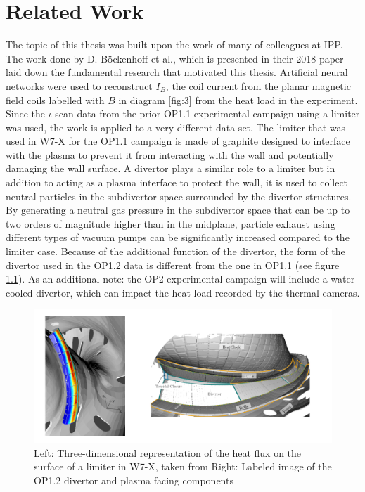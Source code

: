 %
\chapter{Related Work}
\label{sec:related}


The topic of this thesis was built upon the work of many of colleagues at IPP. The work done by D. Böckenhoff et al., which is presented in their 2018 paper \cite{Böckenhoff_2018} laid down the fundamental research that motivated this thesis. Artificial neural networks were used to reconstruct $I_B$, the coil current from the planar magnetic field coils labelled with $B$ in diagram \ref{fig:3} from the heat load in the experiment. Since the $\iota$-scan data from the prior OP1.1 experimental campaign using a limiter was used, the work is applied to a very different data set. The limiter that was used in W7-X for the OP1.1 campaign is made of graphite designed to interface with the plasma to prevent it from interacting with the wall and potentially damaging the wall surface. A divertor plays a similar role to a limiter but in addition to acting as a plasma interface to protect the wall, it is used to collect neutral particles in the subdivertor space surrounded by the divertor structures. By generating a neutral gas pressure in the subdivertor space that can be up to two orders of magnitude higher than in the midplane, particle exhaust using different types of vacuum pumps can be significantly increased compared to the limiter case. Because of the additional function of the divertor, the form of the divertor used in the OP1.2 data is different  from the one in OP1.1 (see figure \ref{fig:limiter-divertor}). As an additional note: the OP2 experimental campaign will include a water cooled divertor, which can impact the heat load recorded by the thermal cameras.

\begin{figure}[!htb]
    \centering
    \includegraphics[width = \textwidth]{images/limiter-divetor.png}
    \caption{Left: Three-dimensional representation of the heat flux on the surface of a limiter in W7-X, taken from \cite{Böckenhoff_2018} Right: Labeled image of the OP1.2 divertor and plasma facing components} \label{fig:limiter-divertor}
\end{figure}

